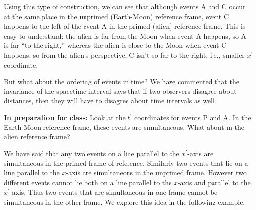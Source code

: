 Using this type of construction, we can see that although events A and
C occur at the same place in the unprimed (Earth-Moon) reference
frame, event C happens to the left of the event A in the primed
(alien) reference frame.  This is easy to understand: the alien is far
from the Moon when event A happens, so A is far ``to the right,''
whereas the alien is close to the Moon when event C happens, so from
the alien's perspective, C isn't so far to the right, i.e.,
smaller $x^\prime$ coordinate.
    
    But what about the ordering of events in time?  We have commented
that the invariance of the spacetime interval says that if two
observers disagree about distances, then they will have to disagree
about time intervals as well.
    
\begin{boxittext}
{{\bf In preparation for class:} Look at the $t^\prime$ coordinates for events
P and A.  In the Earth-Moon reference frame, these events are simultaneous.
What about in the alien reference frame?
}
\end{boxittext}

We have said that any two events on a line parallel to the
$x^\prime$-axis are simultaneous in the primed frame of reference.
Similarly two events that lie on a line parallel to the $x$-axis are
simultaneous in the unprimed frame.  However two different events
cannot lie both on a line parallel to the $x$-axis and parallel to the
$x^\prime$-axis.  Thus two events that are simultaneous in one frame cannot
be simultaneous in the other frame.  We explore this idea in the
following example.

